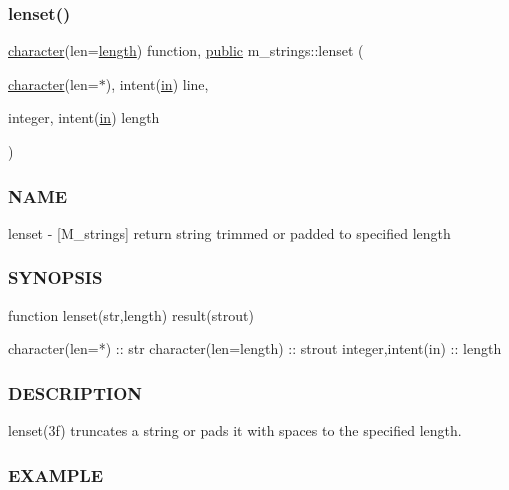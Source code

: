 \subsubsection{\texorpdfstring{lenset()}{lenset()}}
{\footnotesize\ttfamily \hyperlink{option__stopwatch_83_8txt_abd4b21fbbd175834027b5224bfe97e66}{character}(len=\hyperlink{M__stopwatch_83_8txt_a04ed5ef37abacfa36a856b5f30376485}{length}) function, \hyperlink{M__stopwatch_83_8txt_a2f74811300c361e53b430611a7d1769f}{public} m\+\_\+strings\+::lenset (\begin{DoxyParamCaption}\item[{\hyperlink{option__stopwatch_83_8txt_abd4b21fbbd175834027b5224bfe97e66}{character}(len=$\ast$), intent(\hyperlink{M__journal_83_8txt_afce72651d1eed785a2132bee863b2f38}{in})}]{line,  }\item[{integer, intent(\hyperlink{M__journal_83_8txt_afce72651d1eed785a2132bee863b2f38}{in})}]{length }\end{DoxyParamCaption})}



\subsubsection*{N\+A\+ME}

lenset -\/ \mbox{[}M\+\_\+strings\mbox{]} return string trimmed or padded to specified length 

\subsubsection*{S\+Y\+N\+O\+P\+S\+IS}

\begin{DoxyVerb}function lenset(str,length) result(strout)

 character(len=*)                     :: str
 character(len=length)                :: strout
 integer,intent(in)                   :: length
\end{DoxyVerb}


\subsubsection*{D\+E\+S\+C\+R\+I\+P\+T\+I\+ON}

lenset(3f) truncates a string or pads it with spaces to the specified length.

\subsubsection*{E\+X\+A\+M\+P\+LE}

